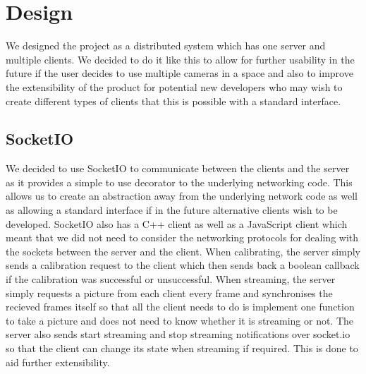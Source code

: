 \documentclass{article}
\begin{document}
\section{Design}
We designed the project as a distributed system which has one server and multiple clients. We decided to do it like this to allow for further usability in the future if the user decides to use multiple cameras in a space and also to improve the extensibility of the product for potential new developers who may wish to create different types of clients that this is possible with a standard interface.
\subsection{SocketIO}
We decided to use SocketIO to communicate between the clients and the server as it provides a simple to use decorator to the underlying networking code. This allows us to create an abstraction away from the underlying network code as well as allowing a standard interface if in the future alternative clients wish to be developed. SocketIO also has a C++ client as well as a JavaScript client which meant that we did not need to consider the networking protocols for dealing with the sockets between the server and the client. When calibrating, the server simply sends a calibration request to the client which then sends back a boolean callback if the calibration was successful or unsuccessful. When streaming, the server simply requests a picture from each client every frame and synchronises the recieved frames itself so that all the client needs to do is implement one function to take a picture and does not need to know whether it is streaming or not. The server also sends start streaming and stop streaming notifications over socket.io so that the client can change its state when streaming if required. This is done to aid further extensibility.
\end{document}
